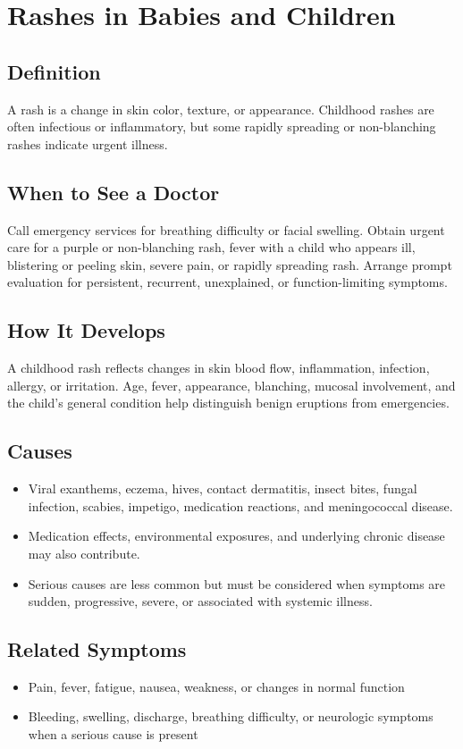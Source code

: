 \chapter{Rashes in Babies and Children}

\section*{Definition}
A rash is a change in skin color, texture, or appearance. Childhood rashes are often infectious or inflammatory, but some rapidly spreading or non-blanching rashes indicate urgent illness.

\section*{When to See a Doctor}
Call emergency services for breathing difficulty or facial swelling. Obtain urgent care for a purple or non-blanching rash, fever with a child who appears ill, blistering or peeling skin, severe pain, or rapidly spreading rash. Arrange prompt evaluation for persistent, recurrent, unexplained, or function-limiting symptoms.

\section*{How It Develops}
A childhood rash reflects changes in skin blood flow, inflammation, infection, allergy, or irritation. Age, fever, appearance, blanching, mucosal involvement, and the child's general condition help distinguish benign eruptions from emergencies.

\section*{Causes}
\begin{itemize}
  \item Viral exanthems, eczema, hives, contact dermatitis, insect bites, fungal infection, scabies, impetigo, medication reactions, and meningococcal disease.
  \item Medication effects, environmental exposures, and underlying chronic disease may also contribute.
  \item Serious causes are less common but must be considered when symptoms are sudden, progressive, severe, or associated with systemic illness.
\end{itemize}

\section*{Related Symptoms}
\begin{itemize}
  \item Pain, fever, fatigue, nausea, weakness, or changes in normal function
  \item Bleeding, swelling, discharge, breathing difficulty, or neurologic symptoms when a serious cause is present
\end{itemize}

